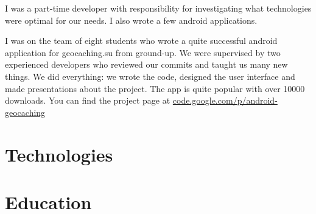 \documentclass[11pt,a4paper]{moderncv-xetex}
\begin{document}
    {I was a part-time developer with responsibility for investigating what technologies were optimal for our needs. I also wrote a few android applications.}
    
    {
    I was on the team of eight students who wrote a quite successful android application for geocaching.su from ground-up. We were supervised by two experienced developers who reviewed our commits and taught us many new things. We did everything: we wrote the code, designed the user interface and made presentations about the project. The app is quite popular with over 10000 downloads. You can find the project page at \url{code.google.com/p/android-geocaching}}


\section{Technologies}

\section{Education}

\end{document}

